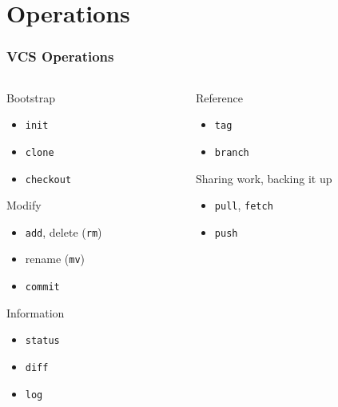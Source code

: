 \documentclass[english,compress]{beamer}
\newcommand{\cw}{\texttt} %
\begin{document}
\section{Operations}
\frame
{
    \frametitle{VCS Operations}
        \begin{columns}
            \begin{column}{.5\textwidth}
        Bootstrap
            \begin{itemize}
                \item \cw{init}
                \item \cw{clone}
                \item \cw{checkout}
            \end{itemize}
        Modify
        \begin{itemize}
            \item \cw{add}, delete (\cw{rm})
			\item rename (\cw{mv})
            \item \cw{commit}
        \end{itemize}
         Information
        \begin{itemize}
            \item \cw{status}
            \item \cw{diff}
            \item \cw{log}
        \end{itemize}
   \end{column}
    \begin{column}{.5\textwidth}
        Reference
        \begin{itemize}
            \item \cw{tag}
            \item \cw{branch}
        \end{itemize}
        Sharing work, backing it up
\begin{itemize}
    \item \cw{pull}, \cw{fetch}
    \item \cw{push}
\end{itemize}

    \end{column}
\end{columns}

}
\frame
\end{document}
